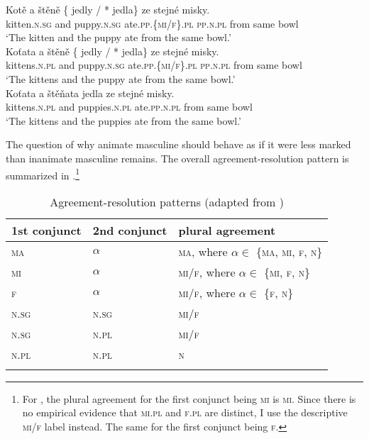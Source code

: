 \documentclass[output=paper,
modfonts
newtxmath,
hidelinks
]{langscibook}
\begin{document}
\ea\label{neuter}
\ea\gll Kotě a štěně \{\hspace{-2pt} jedly / *\hspace{-2pt} jedla\} ze stejné misky.\label{n-a}\\
kitten.\textsc{n.sg} and puppy.\textsc{n.sg} {} ate.\textsc{pp.\{mi/f\}.pl} {} {} \textsc{pp.n.pl} from same bowl\\
\glt `The kitten and the puppy  ate from the same bowl.'\\\hfill {}\smallskip
\ex\gll Koťata a štěně \{\hspace{-2pt} jedly / *\hspace{-2pt} jedla\} ze stejné misky.\label{n-b}\\
kittens.\textsc{n.pl} and puppy.\textsc{n.sg} {} ate.\textsc{pp.\{mi/f\}.pl} {} {} \textsc{pp.n.pl} from same bowl\\
\glt `The kittens and the puppy  ate from the same bowl.'\\\hfill {}\smallskip
\ex\gll Koťata a štěňata jedla ze stejné misky.\label{n-c}\\
kittens.\textsc{n.pl} and puppies.\textsc{n.pl} ate.\textsc{pp.n.pl} from same bowl\label{n-pl}\\
\glt `The kittens and the puppies  ate from the same bowl.'\\\hfill {}
\z\z

\noindent The question of why animate masculine should behave as if it were less marked than inanimate masculine remains. The overall agreement-resolution pattern is summarized in .\footnote{For \citet{Panevova1997}, the plural agreement for the first conjunct being \textsc{mi} is \textsc{mi}. Since there is no empirical evidence that \textsc{mi.pl} and \textsc{f.pl} are distinct, I use the descriptive \textsc{mi/f} label instead. The same for the first conjunct being \textsc{f}.}

\begin{table}
\caption{Agreement-resolution patterns (adapted from \citealt{Panevova1997})}
\label{PPtable}
\begin{tabularx}{0.8\textwidth}{llX}
\lsptoprule
\textbf{1st conjunct} & \textbf{2nd conjunct} & \textbf{plural agreement} \\\midrule
\textsc{ma} & $\alpha$ & \textsc{ma}, where $\alpha \in$ \{\textsc{ma, mi, f, n}\}\\
\textsc{mi} & $\alpha$ & \textsc{mi/f}, where $\alpha \in$ \{\textsc{mi, f, n}\}\\
\textsc{f} & $\alpha$ & \textsc{mi/f}, where $\alpha \in$ \{\textsc{f, n}\}\\
\textsc{n.sg} & \textsc{n.sg} & \textsc{mi/f}\\
\textsc{n.sg} & \textsc{n.pl} & \textsc{mi/f}\\
\textsc{n.pl} & \textsc{n.pl} & \textsc{n}\\\lspbottomrule
\end{tabularx}
\end{table}
\end{document}
